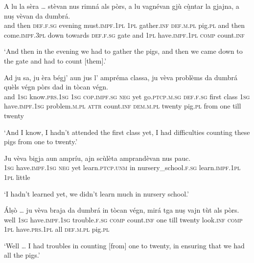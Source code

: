 \begin{linenumbers}
	\gll    A lu la sèra … stèvan nus rimná als pòrs, a lu vagnévan gjù cù̱ntar la gjajna, a nuṣ vèvan da dumbrá. \\
	and then \textsc{def.f.sg} evening {}  must.\textsc{impf.1pl} \textsc{1pl} gather.\textsc{inf} \textsc{def.m.pl} pig.\textsc{pl} and then come.\textsc{impf.3pl} down towards \textsc{def.f.sg} gate and \textsc{1pl} have.\textsc{impf.1pl}  \textsc{comp} count.\textsc{inf}\\
\end{linenumbers}
\medskip
\glt `And then in the evening we had to gather the pigs, and then we came down to the gate and had to count [them].'
\medskip

\begin{linenumbers}
	\gll    Ad ju sa, ju èra bégj’ aun jus l’ ampréma classa, ju vèva problèms da dumbrá quèls végn pòrs dad in tòcan végn.\\
	and  \textsc{1sg} know.\textsc{prs.1sg} \textsc{1sg} \textsc{cop.impf.sg} \textsc{neg} yet go.\textsc{ptcp.m.sg} \textsc{def.f.sg} first class \textsc{1sg} have.\textsc{impf.1sg} problem.\textsc{m.pl} \textsc{attr} count.\textsc{inf} \textsc{dem.m.pl} twenty pig.\textsc{pl} from one till twenty\\
\end{linenumbers}
\medskip
\glt `And I know, I hadn’t attended the first class yet, I had difficulties counting these pigs from one to twenty.'
\medskip

\begin{linenumbers}
\gll  Ju vèva bigja aun ampríu, ajn scùlèta amprandèvan nus pauc.\\
\textsc{1sg} have.\textsc{impf.1sg} \textsc{neg} yet  learn.\textsc{ptcp.unm} in  nursery\_school.\textsc{f.sg} learn.\textsc{impf.1pl}  \textsc{1pl} little \\
\end{linenumbers}
\medskip
\glt `I hadn’t learned yet, we didn’t learn much in nursery school.'
\medskip

\begin{linenumbers}
	\gll    Álṣò … ju vèva braja da dumbrá in tòcan végn, mirá tga nuṣ vajn tùt als pòrs.\\
	well {} \textsc{1sg}  have.\textsc{impf.1sg} trouble.\textsc{f.sg}  \textsc{comp} count.\textsc{inf} one till twenty  look.\textsc{inf} \textsc{comp} \textsc{1pl} have.\textsc{prs.1pl} all \textsc{def.m.pl} pig.\textsc{pl}\\
\end{linenumbers}
\medskip
\glt `Well … I had troubles in counting [from] one to twenty, in ensuring that we had all the pigs.'
\medskip

